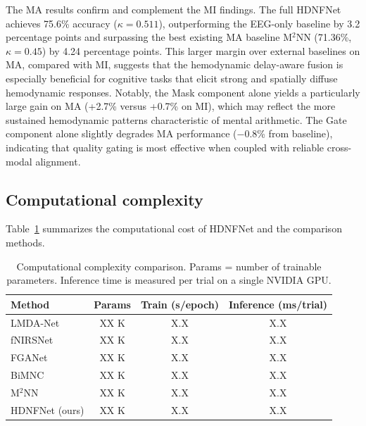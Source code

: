 \documentclass[preprint,12pt,authoryear]{elsarticle}
\begin{document}
The MA results confirm and complement the MI findings. The full HDNFNet achieves 75.6\% accuracy ($\kappa = 0.511$), outperforming the EEG-only baseline by 3.2 percentage points and surpassing the best existing MA baseline M$^2$NN (71.36\%, $\kappa = 0.45$) by 4.24 percentage points. This larger margin over external baselines on MA, compared with MI, suggests that the hemodynamic delay-aware fusion is especially beneficial for cognitive tasks that elicit strong and spatially diffuse hemodynamic responses. Notably, the Mask component alone yields a particularly large gain on MA (+2.7\% versus +0.7\% on MI), which may reflect the more sustained hemodynamic patterns characteristic of mental arithmetic. The Gate component alone slightly degrades MA performance ($-$0.8\% from baseline), indicating that quality gating is most effective when coupled with reliable cross-modal alignment.


\subsection{Computational complexity}
\label{sec:complexity}

Table~\ref{tab:complexity} summarizes the computational cost of HDNFNet and the comparison methods.

\begin{table}[t]
\centering
\caption{Computational complexity comparison. Params = number of trainable parameters. Inference time is measured per trial on a single NVIDIA GPU.}
\label{tab:complexity}
\small
\begin{tabular}{lccc}
\hline
Method & Params & Train (s/epoch) & Inference (ms/trial) \\
\hline
LMDA-Net        & XX K   & X.X  & X.X \\
fNIRSNet        & XX K   & X.X  & X.X \\
FGANet          & XX K   & X.X  & X.X \\
BiMNC           & XX K   & X.X  & X.X \\
M$^2$NN         & XX K   & X.X  & X.X \\
HDNFNet (ours)  & XX K   & X.X  & X.X \\
\hline
\end{tabular}
\end{table}

\end{document}
